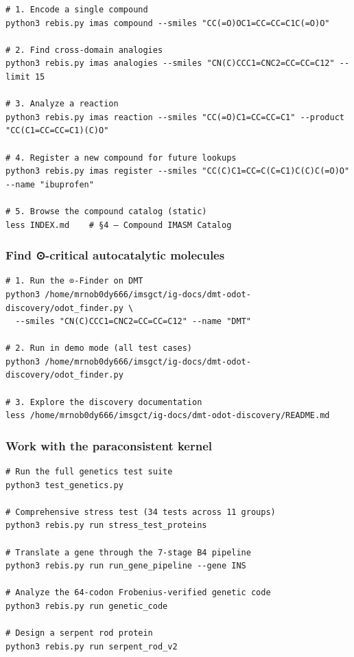 \documentclass[12pt,a4paper]{article}
\begin{document}
\begin{verbatim}
# 1. Encode a single compound
python3 rebis.py imas compound --smiles "CC(=O)OC1=CC=CC=C1C(=O)O"

# 2. Find cross-domain analogies
python3 rebis.py imas analogies --smiles "CN(C)CCC1=CNC2=CC=CC=C12" --limit 15

# 3. Analyze a reaction
python3 rebis.py imas reaction --smiles "CC(=O)C1=CC=CC=C1" --product "CC(C1=CC=CC=C1)(C)O"

# 4. Register a new compound for future lookups
python3 rebis.py imas register --smiles "CC(C)C1=CC=C(C=C1)C(C)C(=O)O" --name "ibuprofen"

# 5. Browse the compound catalog (static)
less INDEX.md    # §4 — Compound IMASM Catalog
\end{verbatim}

\hypertarget{find--critical-autocatalytic-molecules}{%
\subsubsection{Find ⊙-critical autocatalytic
molecules}\label{find--critical-autocatalytic-molecules}}

\begin{verbatim}
# 1. Run the ⊙-Finder on DMT
python3 /home/mrnob0dy666/imsgct/ig-docs/dmt-odot-discovery/odot_finder.py \
  --smiles "CN(C)CCC1=CNC2=CC=CC=C12" --name "DMT"

# 2. Run in demo mode (all test cases)
python3 /home/mrnob0dy666/imsgct/ig-docs/dmt-odot-discovery/odot_finder.py

# 3. Explore the discovery documentation
less /home/mrnob0dy666/imsgct/ig-docs/dmt-odot-discovery/README.md
\end{verbatim}

\hypertarget{work-with-the-paraconsistent-kernel}{%
\subsubsection{Work with the paraconsistent
kernel}\label{work-with-the-paraconsistent-kernel}}

\begin{verbatim}
# Run the full genetics test suite
python3 test_genetics.py

# Comprehensive stress test (34 tests across 11 groups)
python3 rebis.py run stress_test_proteins

# Translate a gene through the 7-stage B4 pipeline
python3 rebis.py run run_gene_pipeline --gene INS

# Analyze the 64-codon Frobenius-verified genetic code
python3 rebis.py run genetic_code

# Design a serpent rod protein
python3 rebis.py run serpent_rod_v2
\end{verbatim}
\end{document}
